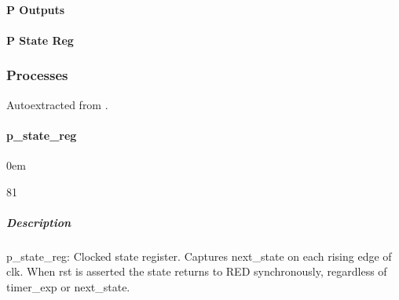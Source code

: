 \documentclass[letterpaper,10pt,english]{sphinxmanual}
\begin{document}
\paragraph{P Outputs}
\label{\detokenize{modules/traffic_light/timing:p-outputs}}
\noindent{}


\paragraph{P State Reg}
\label{\detokenize{modules/traffic_light/timing:p-state-reg}}
\noindent{}

\sphinxstepscope


\subsubsection{Processes}
\label{\detokenize{modules/traffic_light/processes/index:processes}}\label{\detokenize{modules/traffic_light/processes/index::doc}}
\sphinxAtStartPar
Auto\sphinxhyphen{}extracted from .

\sphinxstepscope


\paragraph{p\_state\_reg}
\label{\detokenize{modules/traffic_light/processes/p_state_reg:p-state-reg}}\label{\detokenize{modules/traffic_light/processes/p_state_reg::doc}}
\begin{DUlineblock}{0em}
\item[]  
\item[]  81
\item[]  
\item[]  
\end{DUlineblock}


\subparagraph{Description}
\label{\detokenize{modules/traffic_light/processes/p_state_reg:description}}
\sphinxAtStartPar
p\_state\_reg: Clocked state register.
Captures next\_state on each rising edge of clk.
When rst is asserted the state returns to RED synchronously,
regardless of timer\_exp or next\_state.
\end{document}
